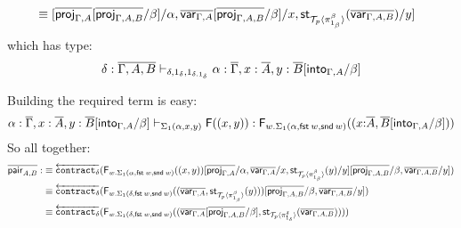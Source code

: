 \documentclass[10pt]{article}
\theoremstyle{definition}
\newcommand\dsd[1]{\ensuremath{\mathsf{#1}}}
\newcommand{\yields}{\vdash}
\newcommand{\app}[2]{\ensuremath{#1 \: #2}}
\newcommand{\telety}[3]{\ensuremath{(#1{:}#2,#3)}}
\newcommand{\fst}[1]{\app{\dsd{fst}}{#1}}
\newcommand{\snd}[1]{\app{\dsd{snd}}{#1}}
\newcommand{\rewrite}[2]{\overleftarrow{#1}(#2)}
\newcommand\F[2]{\ensuremath{\mathsf{F}_{#1}(#2)}}
\newcommand\St[2]{\ensuremath{{#1}^*(#2)}}
\newcommand\StI[2]{\ensuremath{\mathsf{st}_{#1}(#2)}}
\newcommand\FI[1]{\ensuremath{\mathsf{F}{(#1)}}}
\newcommand\FIs[2]{\ensuremath{\mathsf{F}_{#1}{(#2)}}}
\newcommand\ApEl[2]{\mathcal{T}_{#1}\langle#2\rangle}
\begin{document}
\begin{enumerate}[style = multiline, labelwidth = 80pt]
\begin{align*}
&\equiv [\upstairs{\proj{\Gamma, A}}[\upstairs{\proj{\Gamma, A, B}}/\beta]/\alpha, \upstairs{\var{\Gamma, A}}[\upstairs{\proj{\Gamma, A, B}}/\beta]/x, \StI{\ApEl{p}{\pi^{\beta}_{1_{\beta}}}}{\upstairs{\var{\Gamma, A, B}}}/y]
\end{align*}
which has type:
\begin{align*}
\delta :\upstairs{\Gamma, A, B} \yields_{\delta, 1_\delta, 1_{\delta.1_\delta}} \alpha : \upstairs{\Gamma}, x : \upstairs{A}, y : \upstairs{B}[\into{\Gamma,A} /\beta]
\end{align*}

Building the required term is easy:
\begin{align*}
\alpha : \upstairs{\Gamma}, x : \upstairs{A}, y : \upstairs{B}[\into{\Gamma,A}/\beta] \yields_{\Sigma_1(\alpha, x, y)} \FI{(x, y)} : \F{w. \Sigma_1(\alpha,\fst w, \snd w)}{\telety{x}{\upstairs{A}}{\upstairs{B}[\into{\Gamma,A}/\beta]}}
\end{align*}
So all together:
\begin{align*}
\upstairs{\qpair{A,B}} :&\equiv \rewrite{\contract{\delta}}{\FIs{w. \Sigma_1(\alpha,\fst w, \snd w)}{(x, y)}[\upstairs{\proj{\Gamma, A}}/\alpha, \upstairs{\var{\Gamma, A}}/x, \StI{\ApEl{p}{\pi^{\beta}_{1_{\beta}}}}{y}/y][\upstairs{\proj{\Gamma, A, B}}/\beta, \upstairs{\var{\Gamma, A, B}}/y]} \\
&\equiv \rewrite{\contract{\delta}}{\FIs{w. \Sigma_1(\delta,\fst w, \snd w)}{(\upstairs{\var{\Gamma, A}}, \StI{\ApEl{p}{\pi^{\beta}_{1_{\beta}}}}{y})}[\upstairs{\proj{\Gamma, A, B}}/\beta, \upstairs{\var{\Gamma, A, B}}/y]} \\
&\equiv \rewrite{\contract{\delta}}{\FIs{w. \Sigma_1(\delta,\fst w, \snd w)}{(\upstairs{\var{\Gamma, A}}[\upstairs{\proj{\Gamma, A, B}}/\beta], \StI{\ApEl{p}{\pi^{\delta}_{1_{\delta}}}}{\upstairs{\var{\Gamma, A, B}}})}}
\end{align*}

\end{enumerate}
\end{document}
